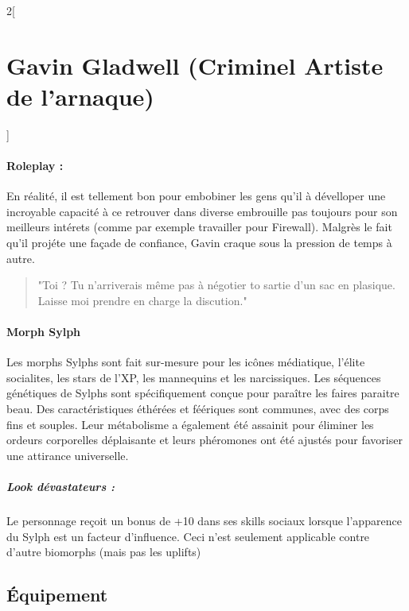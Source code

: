 \documentclass[a4paper,9pt]{article}
\begin{document}
\begin{multicols}{2}[\section*{Gavin Gladwell (Criminel Artiste de l'arnaque)}]
   \paragraph{Roleplay :}
   En réalité, il est tellement bon pour embobiner les gens qu'il à dévelloper
   une incroyable capacité à ce retrouver dans diverse embrouille pas toujours
   pour son meilleurs intérets (comme par exemple travailler pour Firewall).
   Malgrès le fait qu'il projéte une façade de confiance, Gavin craque sous
   la pression de temps à autre.

   \begin{quote}
      "Toi ? Tu n'arriverais même pas à négotier to sartie d'un sac en plasique.
      Laisse moi prendre en charge la discution."
   \end{quote}

   \paragraph{Morph Sylph}

   Les morphs Sylphs sont fait sur-mesure pour les icônes médiatique, l'élite
   socialites, les stars de l'XP, les mannequins et les narcissiques. Les
   séquences génétiques de Sylphs sont spécifiquement conçue pour paraître
   les faires paraitre beau. Des caractéristiques éthérées et féériques sont
   communes, avec des corps fins et souples. Leur métabolisme a également été
   assainit pour éliminer les ordeurs corporelles déplaisante et leurs
   phéromones ont été ajustés pour favoriser une attirance universelle.

   \subparagraph{Look dévastateurs :}
   Le personnage reçoit un bonus de +10 dans ses skills sociaux lorsque
   l'apparence du Sylph est un facteur d'influence.
   Ceci n'est seulement applicable contre d'autre biomorphs (mais pas les uplifts)

   \subsection*{Équipement}


\end{multicols}
\end{document}
